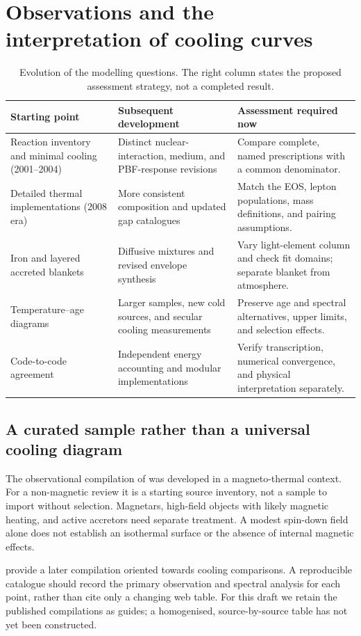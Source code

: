 \documentclass{aa}
\begin{document}
\clearpage
\section{Observations and the interpretation of cooling curves}
\begin{table}
\caption{Evolution of the modelling questions. The right column states the proposed assessment strategy, not a completed result.}
\centering\small
\begin{tabularx}{\textwidth}{p{3.0cm}X X}
\toprule
Starting point & Subsequent development & Assessment required now\\
\midrule
Reaction inventory and minimal cooling (2001--2004) & Distinct nuclear-interaction, medium, and PBF-response revisions & Compare complete, named prescriptions with a common denominator.\\
Detailed thermal implementations (2008 era) & More consistent composition and updated gap catalogues & Match the EOS, lepton populations, mass definitions, and pairing assumptions.\\
Iron and layered accreted blankets & Diffusive mixtures and revised envelope synthesis & Vary light-element column and check fit domains; separate blanket from atmosphere.\\
Temperature--age diagrams & Larger samples, new cold sources, and secular cooling measurements & Preserve age and spectral alternatives, upper limits, and selection effects.\\
Code-to-code agreement & Independent energy accounting and modular implementations & Verify transcription, numerical convergence, and physical interpretation separately.\\
\bottomrule
\end{tabularx}
\end{table}
\subsection{A curated sample rather than a universal cooling diagram}
The observational compilation of \citet{Vigano2013} was developed in a magneto-thermal context. For a non-magnetic review it is a starting source inventory, not a sample to import without selection. Magnetars, high-field objects with likely magnetic heating, and active accretors need separate treatment. A modest spin-down field alone does not establish an isothermal surface or the absence of internal magnetic effects.

\citet{Potekhin2020} provide a later compilation oriented towards cooling comparisons. A reproducible catalogue should record the primary observation and spectral analysis for each point, rather than cite only a changing web table. For this draft we retain the published compilations as guides; a homogenised, source-by-source table has not yet been constructed.
\end{document}
